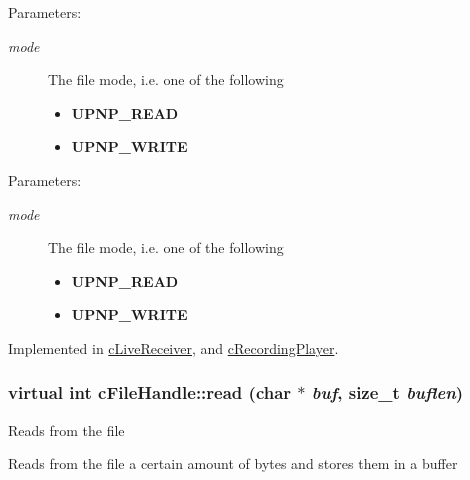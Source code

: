 \begin{Desc}
\item[Parameters:]
\begin{description}
\item[{\em mode}]The file mode, i.e. one of the following\begin{itemize}
\item {\bf UPNP\_\-READ} \item {\bf UPNP\_\-WRITE} \end{itemize}
\end{description}
\end{Desc}
\begin{Desc}
\item[Parameters:]
\begin{description}
\item[{\em mode}]The file mode, i.e. one of the following\begin{itemize}
\item {\bf UPNP\_\-READ} \item {\bf UPNP\_\-WRITE} \end{itemize}
\end{description}
\end{Desc}


Implemented in \hyperlink{classcLiveReceiver_b8e751f641be1da4a925106e3dd062e9}{cLiveReceiver}, and \hyperlink{classcRecordingPlayer_e7ad4362d821f38db5143c0aeff15d97}{cRecordingPlayer}.\hypertarget{classcFileHandle_458f25a4c7f62d528cffc84e66d38e7d}{
\subsubsection[{read}]{\setlength{\rightskip}{0pt plus 5cm}virtual int cFileHandle::read (char $\ast$ {\em buf}, \/  size\_\-t {\em buflen})}}
\label{classcFileHandle_458f25a4c7f62d528cffc84e66d38e7d}


Reads from the file

Reads from the file a certain amount of bytes and stores them in a buffer

